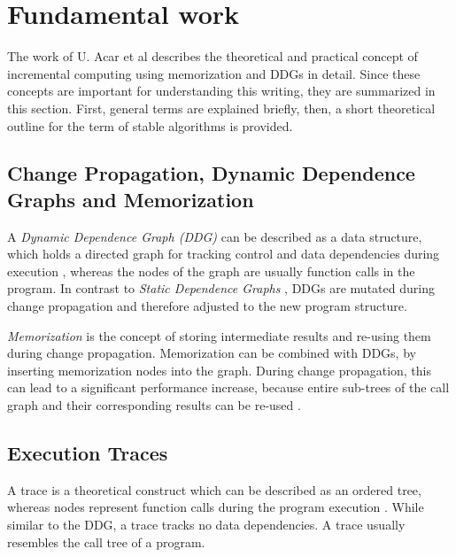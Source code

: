\section{Fundamental work}
The work of U. Acar et al\cite{Acar2005thesis} describes the theoretical and practical concept of incremental computing using memorization and DDGs in detail. Since these concepts are important for understanding this writing, they are summarized in this section. First, general terms are explained briefly, then, a short theoretical outline for the term of stable algorithms is provided. 

\subsection{Change Propagation, Dynamic Dependence Graphs and Memorization}

A \textit{Dynamic Dependence Graph (DDG)} can be described as a data structure, which holds a directed graph for tracking control and data dependencies during execution \cite{Acar2005thesis}, whereas the nodes of the graph are usually function calls in the program. In contrast to \textit{Static Dependence Graphs} \cite{Demers1981}, DDGs are mutated during change propagation and therefore adjusted to the new program structure. 

\textit{Memorization} is the concept of storing intermediate results and re-using them during change propagation. Memorization can be combined with DDGs, by inserting memorization nodes into the graph. During change propagation, this can lead to a significant performance increase, because entire sub-trees of the call graph and their corresponding results can be re-used \cite{Acar2005thesis}. 

\subsection{Execution Traces}

\label{sec:ddg_memo}
A trace is a theoretical construct which can be described as an ordered tree, whereas nodes represent function calls during the program execution \cite{Acar2005thesis}. While similar to the DDG, a trace tracks no data dependencies. A trace usually resembles the call tree of a program. 

